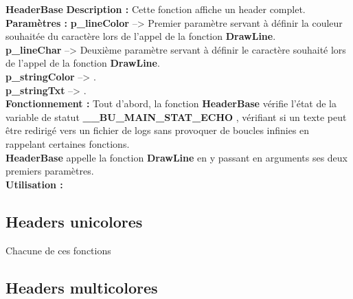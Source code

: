 \documentclass[a4paper,10pt]{article}
\begin{document}
\color{mauve}\textbf{HeaderBase}\color{white}\linebreak
\textbf{Description :}\linebreak
Cette fonction affiche un header complet.\\[1\baselineskip]

\textbf{Paramètres :}\linebreak
\color{orange}\textbf{p\_lineColor }\color{white} --> Premier paramètre servant à définir la couleur souhaitée du caractère lors de l'appel de la fonction \color{mauve}\textbf{DrawLine}\color{white}.\\[1\baselineskip]
\color{orange}\textbf{p\_lineChar }\color{white} --> Deuxième paramètre servant à définir le caractère souhaité lors de l'appel de la fonction \color{mauve}\textbf{DrawLine}\color{white}.\\[1\baselineskip]
\color{orange}\textbf{p\_stringColor }\color{white} --> .\\[1\baselineskip]
\color{orange}\textbf{p\_stringTxt }\color{white} --> .\\[1\baselineskip]

\textbf{Fonctionnement :}\linebreak
Tout d'abord, la fonction \color{mauve}\textbf{HeaderBase }\color{white} vérifie l'état de la variable de statut \color{orange}\textbf{\_\_BU\_MAIN\_STAT\_ECHO }\color{white}, vérifiant si un texte peut être redirigé vers un fichier de logs sans provoquer de boucles infinies en rappelant certaines fonctions\color{white}.\\[1\baselineskip]
\color{mauve}\textbf{HeaderBase }\color{white} appelle la fonction \color{mauve}\textbf{DrawLine }\color{white} en y passant en arguments ses deux premiers paramètres.\\[1\baselineskip]

\textbf{Utilisation :}\linebreak


\color{green}
\subsection{Headers unicolores}\color{white}
Chacune de ces fonctions 

\color{green}
\subsection{Headers multicolores}\color{white}
\end{document}

